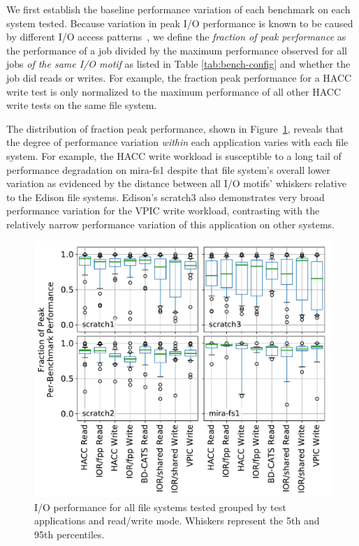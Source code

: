We first establish the baseline performance variation of each benchmark on each system tested.
Because variation in peak I/O performance is known to be caused by different I/O access patterns~\cite{Lofstead2010,Uselton2010,Xie2012}, 
we define the \emph{fraction of peak performance} as the performance of a job divided by the maximum performance observed for all jobs \emph{of the same I/O motif} as listed in Table \ref{tab:bench-config} and whether the job did reads or writes.
For example, the fraction peak performance for a HACC write test is only normalized to the maximum performance of all other HACC write tests on the same file system.

The distribution of fraction peak performance, shown in Figure~\ref{fig:perf-summary-boxplots-motif}, reveals that the degree of performance variation \emph{within} each application varies with each file system.
For example, the HACC write workload is susceptible to a long tail of performance degradation on mira-fs1 despite that file system's overall lower variation as evidenced by the distance between all I/O motifs' whiskers relative to the Edison file systems.
Edison's scratch3 also demonstrates very broad performance variation for the VPIC write workload, contrasting with the relatively narrow performance variation of this application on other systems.

\begin{figure}[t]
    \centering
    \includegraphics[width=1.0\columnwidth]{figs/perf-boxplots.pdf}
    \caption{I/O performance for all file systems tested grouped by test
    applications and read/write mode.  Whiskers represent the 5th and 95th
    percentiles.}
    \label{fig:perf-summary-boxplots-motif}
\vspace{-.2in}
\end{figure}

